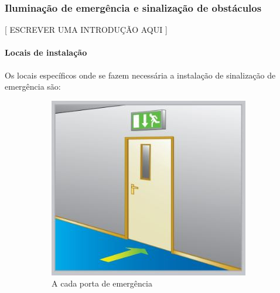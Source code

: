 \subsubsection{Iluminação de emergência e sinalização de obstáculos}

	[ ESCREVER UMA INTRODUÇÃO AQUI ]

	\paragraph{Locais de instalação}
	
	Os locais específicos onde se fazem necessária a instalação de sinalização de emergência são:
	
	\begin{figure}[H]
		\centering
		\begin{subfigure}[b]{0.3\textwidth}
			\centering
			\includegraphics[width=\textwidth]{Figures/3. Lighting/light-safety1.jpg}
			\caption{A cada porta de emergência}
			\label{fig: style 1 image a}
		\end{subfigure}
		\hfill
		\begin{subfigure}[b]{0.3\textwidth}
			\centering

\end{subfigure}
\end{figure}
